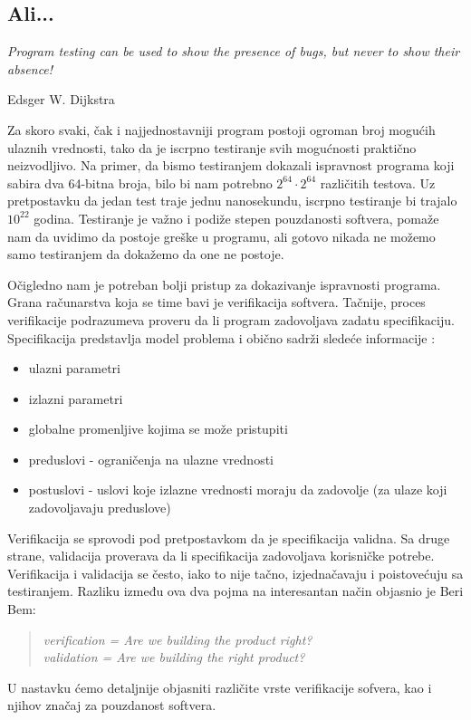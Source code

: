 \documentclass[a4paper]{article}
\begin{document}
\subsection{Ali...}
\label{subsec:ali}
\epigraph{\emph{Program testing can be used to show the presence of bugs, but never to show their absence!}}{Edsger W. Dijkstra}

Za skoro svaki, čak i najjednostavniji program postoji ogroman broj mogućih ulaznih vrednosti, tako da je iscrpno testiranje svih mogućnosti praktično neizvodljivo.
Na primer, da bismo testiranjem dokazali ispravnost programa koji sabira dva 64-bitna broja, bilo bi nam potrebno $2^{64} \cdot 2^{64}$ različitih testova.
Uz pretpostavku da jedan test traje jednu nanosekundu, iscrpno testiranje bi trajalo $10^{22}$ godina.
Testiranje je važno i podiže stepen pouzdanosti softvera, pomaže nam da uvidimo da postoje greške u programu, ali gotovo nikada ne možemo samo testiranjem da dokažemo da one ne postoje.

Očigledno nam je potreban bolji pristup za dokazivanje ispravnosti programa.
Grana računarstva koja se time bavi je verifikacija softvera.
Tačnije, proces verifikacije podrazumeva proveru da li program zadovoljava zadatu specifikaciju.
Specifikacija predstavlja model problema i obično sadrži sledeće informacije \cite{laski2009software}:
\begin{itemize}
\item ulazni parametri
\item izlazni parametri
\item globalne promenljive kojima se može pristupiti
\item preduslovi - ograničenja na ulazne vrednosti
\item postuslovi - uslovi koje izlazne vrednosti moraju da zadovolje (za ulaze koji zadovoljavaju preduslove)
\end{itemize}
Verifikacija se sprovodi pod pretpostavkom da je specifikacija validna.
Sa druge strane, validacija proverava da li specifikacija zadovoljava korisničke potrebe.
Verifikacija i validacija se često, iako to nije tačno, izjednačavaju i poistovećuju sa testiranjem.
Razliku između ova dva pojma na interesantan način objasnio je Beri Bem:
\begin{quote}
\emph{verification = Are we building the product right? \\
validation = Are we building the right product?}
\end{quote}

U nastavku ćemo detaljnije objasniti različite vrste verifikacije sofvera, kao i njihov značaj za pouzdanost softvera.
\end{document}
